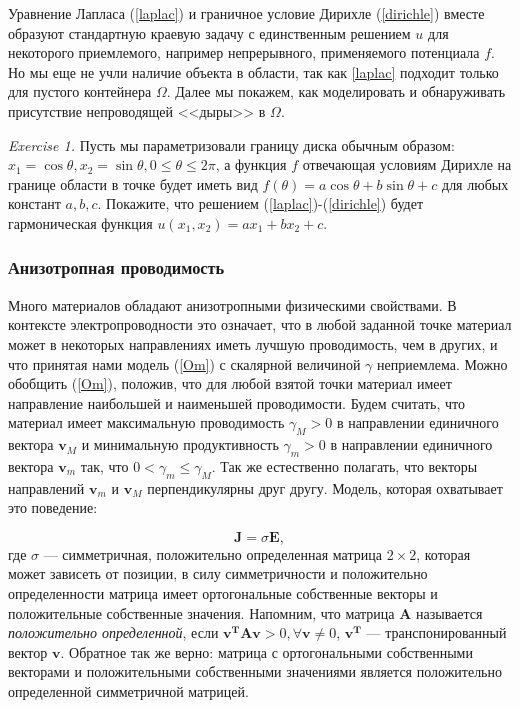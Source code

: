\documentclass[a4paper, 12pt]{article}
\begin{document}
Уравнение Лапласа (\ref{laplac}) и граничное условие Дирихле (\ref{dirichle}) вместе образуют стандартную краевую задачу с единственным решением $u$ для некоторого приемлемого, например непрерывного, применяемого потенциала $f$. Но мы еще не учли наличие объекта в области, так как \ref{laplac} подходит только для пустого контейнера $\Omega$. Далее мы покажем, как моделировать и обнаруживать присутствие непроводящей <<дыры>> в $\Omega$.


\textit{Exercise 1.\;} Пусть мы параметризовали границу диска обычным образом: $x_1 = \cos \theta, x_2 = \sin \theta, 0 \le \theta \le 2 \pi$, а функция $f$  отвечающая условиям Дирихле на границе области в точке будет иметь вид $f(\theta) = a \cos \theta + b \sin \theta + c$ для любых констант $a, b ,c$. Покажите, что решением (\ref{laplac})-(\ref{dirichle}) будет гармоническая функция $u(x_1, x_2) = a x_1 + b x_2 + c$.

\subsubsection{Анизотропная проводимость}


Много материалов обладают анизотропными физическими свойствами. В контексте электропроводности это означает, что в любой заданной точке материал может в некоторых направлениях иметь лучшую проводимость, чем в других, и что принятая нами модель (\ref{Om}) с скалярной величиной $\gamma$ неприемлема. Можно обобщить (\ref{Om}), положив, что для любой взятой точки материал имеет направление наибольшей и наименьшей проводимости. Будем считать, что материал имеет максимальную проводимость $\gamma_M > 0$ в направлении единичного вектора $\textbf{v}_M$ и минимальную продуктивность $\gamma_m > 0$ в направлении единичного вектора $\textbf{v}_m$ так, что $0 < \gamma_m \le \gamma_M$. Так же естественно полагать, что векторы направлений $\textbf{v}_m$ и $\textbf{v}_M$ перпендикулярны друг другу. Модель, которая охватывает это поведение:

\begin{equation} \label{ani}
\textbf{J} = \sigma \textbf{E},
\end{equation}
где $\sigma$ --- симметричная, положительно определенная матрица $2 \times 2$, которая может зависеть от позиции, в силу симметричности и положительно определенности матрица имеет ортогональные собственные векторы и положительные собственные значения. Напомним, что матрица $\textbf{A}$ называется \textit{положительно определенной}, если  $\textbf{v}^{\textbf{T}}\textbf{Av} > 0, \forall \textbf{v} \ne 0$, $\textbf{v}^{\textbf{T}}$ --- транспонированный вектор $\textbf{v}$. Обратное так же верно: матрица с ортогональными собственными векторами и положительными собственными значениями является положительно определенной симметричной матрицей.
\end{document}
